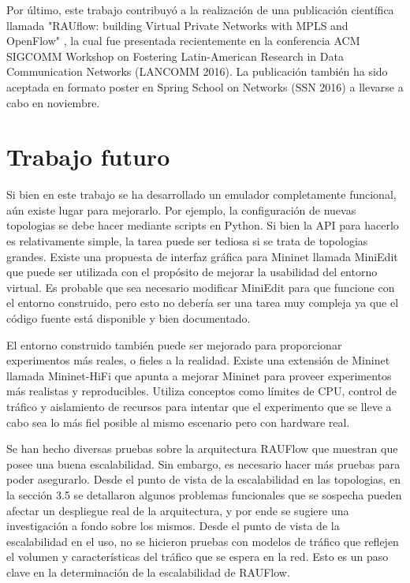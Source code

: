 Por último, este trabajo contribuyó a la realización de una publicación científica llamada "RAUflow: building Virtual Private Networks with MPLS and OpenFlow" \cite{rauflow}, la cual fue presentada recientemente en la conferencia ACM SIGCOMM Workshop on Fostering Latin-American Research in Data Communication Networks (LANCOMM 2016). La publicación también ha sido aceptada en formato poster en Spring School on Networks (SSN 2016) a llevarse a cabo en noviembre.


\section{Trabajo futuro}

Si bien en este trabajo se ha desarrollado un emulador completamente funcional, aún existe lugar para mejorarlo. Por ejemplo, la configuración de nuevas topologias se debe hacer mediante scripts en Python. Si bien la API para hacerlo es relativamente simple, la tarea puede ser tediosa si se trata de topologias grandes. Existe una propuesta de interfaz gráfica para Mininet llamada MiniEdit \cite{miniedit} que puede ser utilizada con el propósito de mejorar la usabilidad del entorno virtual. Es probable que sea necesario modificar MiniEdit para que funcione con el entorno construido, pero esto no debería ser una tarea muy compleja ya que el código fuente está disponible y bien documentado.

El entorno construido también puede ser mejorado para proporcionar experimentos más reales, o fieles a la realidad. Existe una extensión de Mininet llamada Mininet-HiFi \cite{mininet-hifi} que apunta a mejorar Mininet para proveer experimentos más realistas y reproducibles. Utiliza conceptos como límites de CPU, control de tráfico y aislamiento de recursos para intentar que el experimento que se lleve a cabo sea lo más fiel posible al mismo escenario pero con hardware real.

Se han hecho diversas pruebas sobre la arquitectura RAUFlow que muestran que posee una buena escalabilidad. Sin embargo, es necesario hacer más pruebas para poder asegurarlo. Desde el punto de vista de la escalabilidad en las topologias, en la sección 3.5 se detallaron algunos problemas funcionales que se sospecha pueden afectar un despliegue real de la arquitectura, y por ende se sugiere una investigación a fondo sobre los mismos. Desde el punto de vista de la escalabilidad en el uso, no se hicieron pruebas con modelos de tráfico que reflejen el volumen y características del tráfico que se espera en la red. Esto es un paso clave en la determinación de la escalabilidad de RAUFlow.

